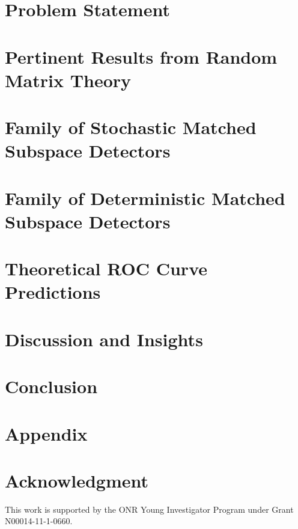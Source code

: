 \documentclass[10pt,twocolumn,twoside]{IEEEtran}
\begin{document}
\section{Problem Statement}\label{sec:prob_state}


\section{Pertinent Results from Random Matrix Theory}\label{sec:rmt}


\section{Family of Stochastic Matched Subspace Detectors}\label{sec:msd_stoch}


\section{Family of Deterministic Matched Subspace Detectors}\label{sec:msd_determ}


\section{Theoretical ROC Curve Predictions}\label{sec:roc_theory}


\section{Discussion and Insights}\label{sec:results}


\section{Conclusion}\label{sec:conclusion}


\section*{Appendix}


\section*{Acknowledgment}

This work is supported by the ONR Young Investigator Program under Grant N00014-11-1-0660.
\end{document}
